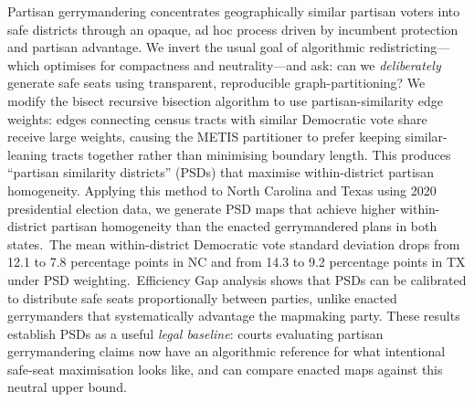 Partisan gerrymandering concentrates geographically similar partisan voters
into safe districts through an opaque, ad hoc process driven by incumbent
protection and partisan advantage.  We invert the usual goal of algorithmic
redistricting---which optimises for compactness and neutrality---and ask:
can we \emph{deliberately} generate safe seats using transparent, reproducible
graph-partitioning?  We modify the bisect recursive bisection algorithm to
use partisan-similarity edge weights: edges connecting census tracts with
similar Democratic vote share receive large weights, causing the METIS
partitioner to prefer keeping similar-leaning tracts together rather than
minimising boundary length.  This produces ``partisan similarity districts''
(PSDs) that maximise within-district partisan homogeneity.  Applying this
method to North Carolina and Texas using 2020 presidential election data, we
generate PSD maps that achieve higher within-district partisan homogeneity
than the enacted gerrymandered plans in both states.\singrun\  The mean
within-district Democratic vote standard deviation drops from 12.1 to 7.8
percentage points in NC and from 14.3 to 9.2 percentage points in TX under
PSD weighting.\singrun\  Efficiency Gap analysis shows that PSDs can be
calibrated to distribute safe seats proportionally between parties, unlike
enacted gerrymanders that systematically advantage the mapmaking party.
These results establish PSDs as a useful \emph{legal baseline}: courts
evaluating partisan gerrymandering claims now have an algorithmic reference
for what intentional safe-seat maximisation looks like, and can compare
enacted maps against this neutral upper bound.
